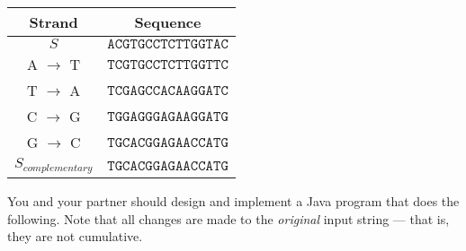 \begin{center}

\begin{tabular}{|cc|}
\hline
\textbf{Strand} & \textbf{Sequence}\\
\hline\hline
$S$      & $\mathtt{ACGTGCCTCTTGGTAC}$ \\
\hline
A $\to$ T &  $\mathtt{TCGTGCCTCTTGGTTC}$ \\
T $\to$ A &  $\mathtt{TCGAGCCACAAGGATC}$ \\
C $\to$ G &  $\mathtt{TGGAGGGAGAAGGATG}$ \\
G $\to$ C &  $\mathtt{TGCACGGAGAACCATG}$ \\
\hline
$S_{complementary}$ &  $\mathtt{TGCACGGAGAACCATG}$ \\
\hline
\end{tabular}
\end{center}

You and your partner should design and implement a Java program that does the following.  Note that all changes are made
to the {\em original} input string --- that is, they are not cumulative.

